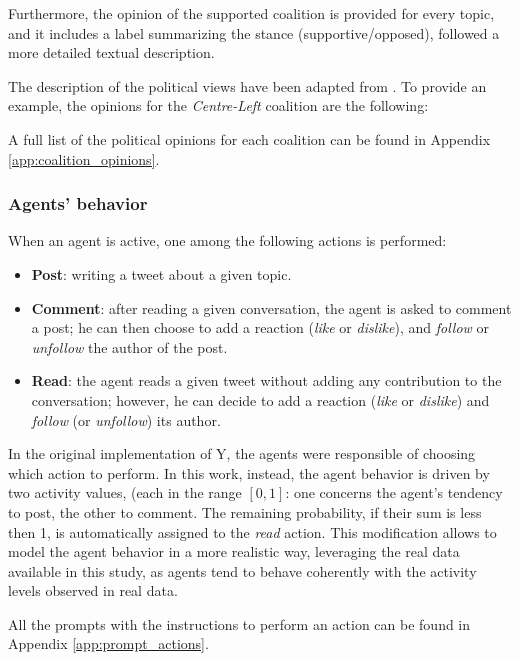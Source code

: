 Furthermore, the opinion of the supported coalition is provided for every topic, and it includes a label summarizing the stance (supportive/opposed), followed a more detailed textual description.

The description of the political views have been adapted from \cite{wired2022elezioni12punti, ilpost2022partiti, pagellapolitica2022confronto, pagellapolitica2022programmi}.
To provide an example, the opinions for the \textit{Centre-Left} coalition are the following:



A full list of the political opinions for each coalition can be found in Appendix \ref{app:coalition_opinions}.



\subsubsection{Agents' behavior}
When an agent is active, one among the following actions is performed:
\begin{itemize}
    \item \textbf{Post}: writing a tweet about a given topic.
    \item \textbf{Comment}: after reading a given conversation, the agent is asked to comment a post; he can then choose to add a reaction (\textit{like} or \textit{dislike}), and \textit{follow} or \textit{unfollow} the author of the post.
    \item \textbf{Read}: the agent reads a given tweet without adding any contribution to the conversation; however, he can decide to add a reaction (\textit{like} or \textit{dislike}) and \textit{follow} (or \textit{unfollow}) its author.
\end{itemize}

\medskip
In the original implementation of Y, the agents were responsible of choosing which action to perform.
In this work, instead, the agent behavior is driven by two activity values, (each in the range $[0,1]$: one concerns the agent's tendency to post, the other to comment. 
The remaining probability, if their sum is less then 1, is automatically assigned to the \textit{read} action.
This modification allows to model the agent behavior in a more realistic way, leveraging the real data available in this study, as agents tend to behave coherently with the activity levels observed in real data.

All the prompts with the instructions to perform an action can be found in Appendix \ref{app:prompt_actions}.


